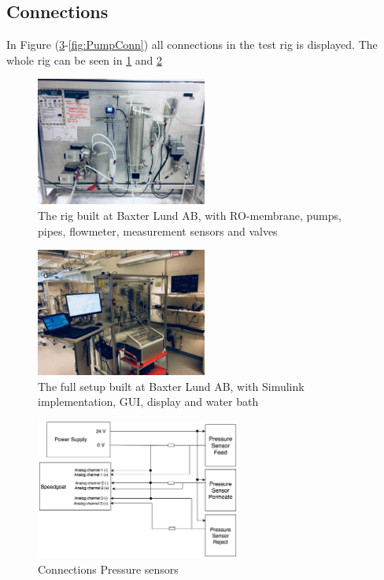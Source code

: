 \subsection{Connections}
In Figure (\ref{fig:PressConn}-\ref{fig:PumpConn}) all connections in the test rig is displayed. The whole rig can be seen in \ref{fig:Rig1} and \ref{fig:Rig2}
\begin{figure}[h]
    \centering
    \includegraphics[width=0.5\textwidth]{Rig1}
    \caption{The rig built at Baxter Lund AB, with RO-membrane, pumps, pipes, flowmeter, measurement sensors and valves}
    \label{fig:Rig1}
\end{figure}
\begin{figure}[h]
    \centering
    \includegraphics[width=0.5\textwidth]{Rig2}
    \caption{The full setup built at Baxter Lund AB, with Simulink implementation, GUI, display and water bath}
    \label{fig:Rig2}
\end{figure}
\begin{figure}[h]
    \centering
    \includegraphics[width=0.6\textwidth]{PressConn}
    \caption{Connections Pressure sensors}
    \label{fig:PressConn}
\end{figure}
